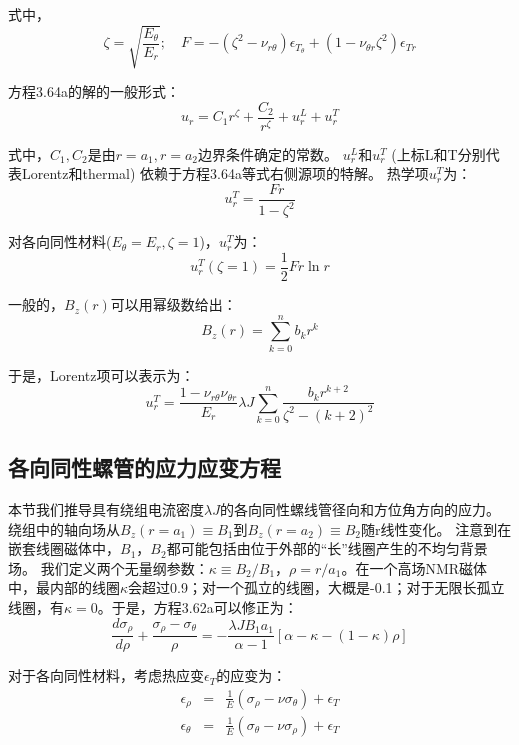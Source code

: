 式中，
\begin{equation}
\zeta=\sqrt{\frac{E_\theta}{E_r}};\quad F=
-(\zeta^2-\nu_{r \theta})\epsilon_{T_\theta}+(1-\nu_{\theta r}\zeta^2)\epsilon_{Tr}
\end{equation}

方程3.64a的解的一般形式：
\begin{equation}
u_r=C_1r^\zeta+\frac{C_2}{r^\zeta}+u_r^L+u_r^T
\end{equation}

式中，$C_1,C_2$是由$r = a_1, r = a_2$边界条件确定的常数。
$u^L_r$和$u^T_r$ (上标L和T分别代表Lorentz和thermal) 依赖于方程3.64a等式右侧源项的特解。
热学项$u^T_r$为：
\begin{equation}
u_r^T=\frac{Fr}{1-\zeta^2}
\end{equation}

对各向同性材料($E_\theta =E_r,\zeta =1$)，$u_r^T$为：
\begin{equation}
u_r^T(\zeta=1)=\frac{1}{2}Fr \ln r
\end{equation}

一般的，$B_z(r)$可以用幂级数给出：
\begin{equation}
B_z(r)=\sum_{k=0}^{n}b_kr^k
\end{equation}

于是，Lorentz项可以表示为：
\begin{equation}
u_r^T=\frac{1-\nu_{r\theta}\nu_{\theta r}}{E_r}\lambda J\sum_{k=0}^{n}\frac{b_k r^{k+2}}{\zeta^2-(k+2)^2}
\end{equation}

\subsection{各向同性螺管的应力应变方程}
本节我们推导具有绕组电流密度$\lambda J$的各向同性螺线管径向和方位角方向的应力。
绕组中的轴向场从$B_z(r = a_1)\equiv B_1$到$B_z(r = a_2)\equiv B_2$随r线性变化。
注意到在嵌套线圈磁体中，$B_1，B_2$都可能包括由位于外部的“长”线圈产生的不均匀背景场。
我们定义两个无量纲参数：$\kappa\equiv B_2/B_1，\rho = r/a_1$。在一个高场NMR磁体中，最内部的线圈$\kappa$会超过0.9；对一个孤立的线圈，大概是-0.1；对于无限长孤立线圈，有$\kappa=0$。于是，方程3.62a可以修正为：
\begin{equation}
\frac{d\sigma_{\rho}}{d\rho}+\frac{\sigma_\rho-\sigma_\theta}{\rho}=-\frac{\lambda JB_1a_1}{\alpha-1}[\alpha-\kappa-(1-\kappa)\rho]
\end{equation}

对于各向同性材料，考虑热应变$\epsilon_T$的应变为：
\begin{eqnarray}
\epsilon_\rho&=&\frac{1}{E}(\sigma_\rho-\nu\sigma_\theta)+\epsilon_T\\
\epsilon_\theta&=&\frac{1}{E}(\sigma_\theta-\nu\sigma_\rho)+\epsilon_T
\end{eqnarray}

